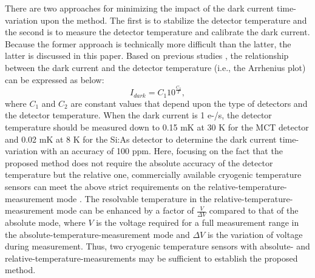 \documentclass{aastex62}
\begin{document}
There are two approaches for minimizing the impact of the dark current time-variation upon the method. The first is to stabilize the detector temperature and the second is to measure the detector temperature and calibrate the dark current. Because the former approach is technically more difficult than the latter, the latter is discussed in this paper. Based on previous studies \citep[i.e.,][]{2003SPIE.4850..890E, 2013SPIE.1306..6978}, the relationship between the dark current and the detector temperature (i.e., the Arrhenius plot) can be expressed as below:
\begin{equation}
I_{dark} = C_{1}10^{\frac{C_2}{T}} ,
\end{equation}
where $C_1$ and $C_2$ are constant values that depend upon the type of detectors and the detector temperature. When the dark current is 1 e-/s, the detector temperature should be measured down to 0.15 mK at 30 K for the MCT detector and 0.02 mK at 8 K for the Si:As detector to determine the dark current time-variation with an accuracy of 100 ppm. Here, focusing on the fact that the proposed method does not require the absolute accuracy of the detector temperature but the relative one, commercially available cryogenic temperature sensors \citep[i.e.,][]{2001IEEE...1...52} can meet the above strict requirements on the relative-temperature-measurement mode \citep{1994OMEGA}. The resolvable temperature in the relative-temperature-measurement mode can be enhanced by a factor of $\frac{V}{\Delta V}$ compared to that of the absolute mode, where $V$ is the voltage required for a full measurement range in the absolute-temperature-measurement mode and $\Delta V$ is the variation of voltage during measurement. Thus, two cryogenic temperature sensors with absolute- and relative-temperature-measurements may be sufficient to establish the proposed method.
\end{document}
